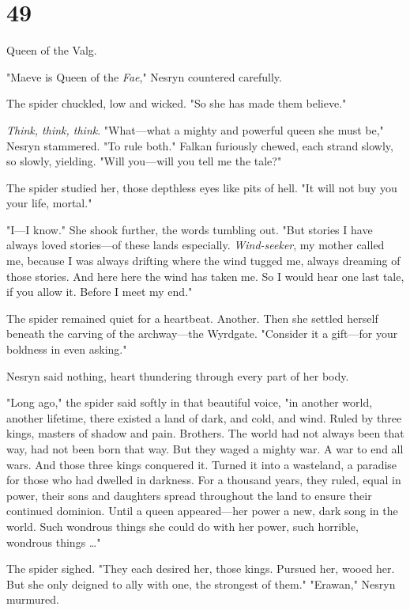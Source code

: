 
\chapter{49}

Queen of the Valg.

"Maeve is Queen of the \emph{Fae}," Nesryn countered carefully.

The spider chuckled, low and wicked. "So she has made them believe."

\emph{Think, think, think}. "What---what a mighty and powerful queen she must be," Nesryn stammered. "To rule both." Falkan furiously chewed, each strand slowly, so slowly, yielding. "Will you---will you tell me the tale?"

The spider studied her, those depthless eyes like pits of hell. "It will not buy you your life, mortal."

"I---I know." She shook further, the words tumbling out. "But stories
 I have always loved stories---of these lands especially.
\emph{Wind-seeker}, my mother called me, because I was always drifting where the wind tugged me, always dreaming of those stories. And here
 here the wind has taken me. So I would hear one last tale, if you allow it. Before I meet my end."

The spider remained quiet for a heartbeat. Another. Then she settled herself beneath the carving of the archway---the Wyrdgate. "Consider it a gift---for your boldness in even asking."

Nesryn said nothing, heart thundering through every part of her body.

"Long ago," the spider said softly in that beautiful voice, "in another world, another lifetime, there existed a land of dark, and cold, and wind. Ruled by three kings, masters of shadow and pain. Brothers. The world had not always been that way, had not been born that way. But they waged a mighty war. A war to end all wars. And those three kings conquered it. Turned it into a wasteland, a paradise for those who had dwelled in darkness. For a thousand years, they ruled, equal in power, their sons and daughters spread throughout the land to ensure their continued dominion. Until a queen appeared---her power a new, dark song in the world. Such wondrous things she could do with her power, such horrible, wondrous things \ldots"

The spider sighed. "They each desired her, those kings. Pursued her, wooed her. But she only deigned to ally with one, the strongest of them." "Erawan," Nesryn murmured.

